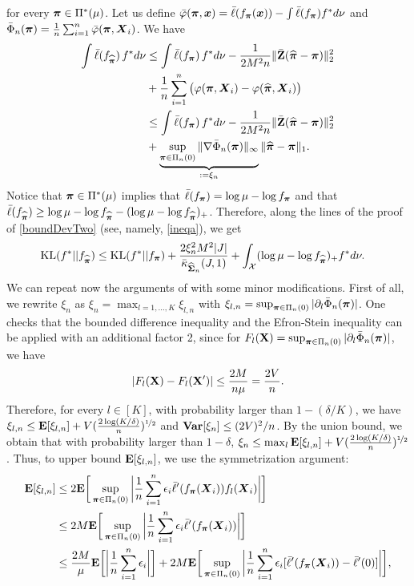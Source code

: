 for every $\boldsymbol \pi\in\Pi^*(\mu)$. Let us define $\bar \varphi(\boldsymbol \pi,\boldsymbol x) = \bar\ell(f_{\boldsymbol \pi}(\boldsymbol x))-
\int \bar\ell(f_{\boldsymbol \pi})f^*d\nu$ and $\bar\Phi_n(\boldsymbol \pi) = \frac1n\sum_{i=1}^n
\bar\varphi(\boldsymbol \pi,\boldsymbol X_i)$. We have
\begin{align}
\int \bar\ell(f_{\widehat{\boldsymbol \pi}})\,f^*d\nu
&\leq \int \bar\ell(f_{\boldsymbol \pi})\,f^*d\nu-\frac{1}{2M^2n}\|\bar{\mathbf Z}(\widehat{\boldsymbol \pi}-\boldsymbol \pi)\|_2^2\nonumber\\
&+ \frac1n\sum_{i=1}^n \big(\varphi(\boldsymbol \pi,\boldsymbol X_i)-\varphi(\widehat{\boldsymbol \pi},\boldsymbol X_i)\big)\label{tempOraclIneqb}\\
&\leq \int \bar\ell(f_{\boldsymbol \pi})\,f^*d\nu-\frac{1}{2M^2n}\|\bar{\mathbf Z}(\widehat{\boldsymbol \pi}-\boldsymbol \pi)\|_2^2\nonumber\\
&+\underbrace{\sup_{\boldsymbol \pi\in \Pi_n(0)}\|\nabla\bar\Phi_n(\boldsymbol \pi)\|_\infty}_{:=\xi_n} \|\widehat{\boldsymbol \pi}-\boldsymbol \pi \|_1.
\end{align}
Notice that $\boldsymbol \pi\in\Pi^*(\mu)$ implies that $\bar\ell(f_{\boldsymbol \pi}) = \log\mu-\log f_{\boldsymbol \pi}$
and that $\bar\ell(f_{\widehat{\boldsymbol \pi}}) \ge  \log \mu-\log f_{\widehat{\boldsymbol \pi}} -(\log\mu-\log f_{\widehat{\boldsymbol \pi}})_+ $.
Therefore, along the lines of the proof of \eqref{boundDevTwo} (see, namely, \eqref{ineqa}),
we get
\begin{align}
\label{tempOraclIneqC}
{\rm KL}(f^*||f_{\widehat{\boldsymbol \pi}})
&\leq {\rm KL}(f^*||f_{\boldsymbol \pi}) + \frac{2\xi_n^2M^2|J|}{\bar\kappa_{\widehat{\boldsymbol\Sigma}_n}(J,1)}
+\int_{\mathcal X}(\log\mu-\log f_{\widehat{\boldsymbol \pi}})_+f^*d\nu.
\end{align}
We can repeat now the arguments of  with some minor modifications. First of all, we
rewrite $\xi_n$ as $\xi_n = \max_{l=1,\ldots,K} \xi_{l,n}$ with $\xi_{l,n} = \sup_{\boldsymbol \pi\in\Pi_n(0)}
|\partial_l \bar\Phi_n(\boldsymbol \pi)|$. One checks that the bounded difference inequality and the Efron-Stein
inequality can be applied with an additional factor 2, since for $F_l(\mathbf X) = \sup_{\boldsymbol \pi\in\Pi_n(0)}
|\partial_l \bar\Phi_n(\boldsymbol \pi)|$, we have
\begin{equation}
|F_l(\mathbf X)-F_l(\mathbf X')| \le \frac{2M}{n\mu} = \frac{2V}{n}.
\end{equation}
Therefore, for every $l\in[K]$, with probability larger than $1-(\delta/K)$, we have $\xi_{l,n}\le
\mathbf E[\xi_{l,n}]+ V(\frac{2\log(K/\delta)}{n})^{\nicefrac12}$ and ${\bf Var}[\xi_n]\le (2V)^2/n$.
By the union bound, we obtain that with probability larger than $1-\delta$,
$\xi_{n}\le \max_l\mathbf E[\xi_{l,n}]+ V(\frac{2\log(K/\delta)}{n})^{\nicefrac12}$. Thus, to upper
bound $\mathbf E[\xi_{l,n}]$, we use the symmetrization argument:
\begin{align}
\mathbf E[\xi_{l,n}]
& \le 2\mathbf E\bigg[\sup_{\boldsymbol \pi\in\Pi_n(0)} \bigg|\frac1n\sum_{i=1}^n \epsilon_i
\bar\ell'(f_{\boldsymbol \pi}(\boldsymbol X_i))f_l(\boldsymbol X_i)\bigg|\bigg]\\
&\le 2M\mathbf E\bigg[\sup_{\boldsymbol \pi\in\Pi_n(0)} \bigg|\frac1n\sum_{i=1}^n \epsilon_i
\bar\ell'(f_{\boldsymbol \pi}(\boldsymbol X_i))\bigg|\bigg]\\\
&\le \frac{2M}{\mu}\mathbf E\bigg[\bigg|\frac1n\sum_{i=1}^n \epsilon_i\bigg|\bigg]+
2M\mathbf E\bigg[\sup_{\boldsymbol \pi\in\Pi_n(0)} \bigg|\frac1n\sum_{i=1}^n \epsilon_i
[\bar\ell'(f_{\boldsymbol \pi}(\boldsymbol X_i))-\bar\ell'(0)]\bigg|\bigg],
\end{align}
